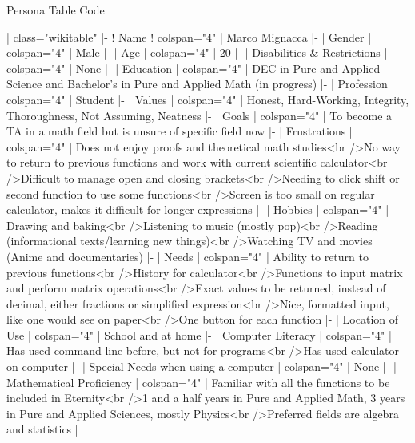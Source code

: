 Persona Table Code

{| class="wikitable" 
|-
! Name
! colspan="4" | Marco Mignacca
|-
| Gender
| colspan="4" | Male
|-
| Age
| colspan="4" | 20
|-
| Disabilities & Restrictions
| colspan="4" | None
|-
| Education
| colspan="4" | DEC in Pure and Applied Science and Bachelor's in Pure and Applied Math (in progress)
|-
| Profession
| colspan="4" | Student
|-
| Values
| colspan="4" | Honest, Hard-Working, Integrity, Thoroughness, Not Assuming, Neatness
|-
| Goals
| colspan="4" | To become a TA in a math field but is unsure of specific field now
|-
| Frustrations
| colspan="4" | Does not enjoy proofs and theoretical math studies<br />No way to return to previous functions and work with current scientific calculator<br />Difficult to manage open and closing brackets<br />Needing to click shift or second function to use some functions<br />Screen is too small on regular calculator, makes it difficult for longer expressions
|-
| Hobbies
| colspan="4" | Drawing and baking<br />Listening to music (mostly pop)<br />Reading (informational texts/learning new things)<br />Watching TV and movies (Anime and documentaries)
|-
| Needs
| colspan="4" | Ability to return to previous functions<br />History for calculator<br />Functions to input matrix and perform matrix operations<br />Exact values to be returned, instead of decimal, either fractions or simplified expression<br />Nice, formatted input, like one would see on paper<br />One button for each function
|-
| Location of Use
| colspan="4" | School and at home
|-
| Computer Literacy
| colspan="4" | Has used command line before, but not for programs<br />Has used calculator on computer
|-
| Special Needs when using a computer
| colspan="4" | None
|-
| Mathematical Proficiency
| colspan="4" | Familiar with all the functions to be included in Eternity<br />1 and a half years in Pure and Applied Math, 3 years in Pure and Applied Sciences, mostly Physics<br />Preferred fields are algebra and statistics
|}